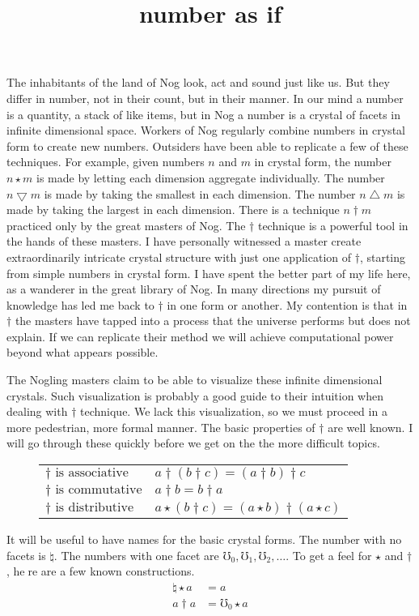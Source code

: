 \documentclass[12pt]{article}
\title{number as if}
\newcommand{\gcd}{\operatorname{gcd}}
\def\gcd{\bigtriangledown}
\def\lcm{\bigtriangleup}
\def\no{\natural}
\begin{document}
\maketitle

The inhabitants of the land of Nog look, act and sound just like us.  But they differ in number,
not in their count, but in their manner. In our mind a number is a quantity, a stack of like items, but in Nog
a number is a crystal of facets in infinite dimensional space. Workers of Nog regularly combine numbers in crystal form
to create new numbers.  Outsiders have been able to replicate a few of these techniques.   For example, given numbers $n$ and $m$ in crystal form, the
number $n\star m$ is made by letting each dimension aggregate individually. The number $n\gcd m$ is made by taking the
smallest in each dimension.  The number $n\lcm m$ is made by taking the
largest in each dimension.  There is a technique $n\dagger m$ practiced only by the great masters of Nog.  The $\dagger$ technique is a powerful
tool in the hands of these masters.  I have personally witnessed a master create extraordinarily intricate crystal structure with just one application of $\dagger$, starting from simple
numbers in crystal form.  I have spent the better part of my life here, as a wanderer in the great library of Nog.  In many directions my pursuit of knowledge has led me back to $\dagger$
in one form or another.  My contention is that in $\dagger$ the masters have tapped into a process that the universe performs but does not explain. If we can replicate their method
we will achieve computational power beyond what appears possible.

The Nogling masters claim to be able to visualize these infinite dimensional crystals.  Such visualization is probably a good guide to their intuition when dealing with $\dagger$ technique.
We lack this visualization, so we must proceed in a more pedestrian, more formal manner.
The basic properties of $\dagger$ are well known.  I will go through these quickly before we get on the the more difficult topics.  

\begin{figure}
\centering
\begin{tabular}{l|l}
$\dagger \text{ is associative}$ & $a\dagger(b\dagger c) = (a\dagger b) \dagger c$\\
$\dagger \text{ is commutative}$ & $a \dagger b = b\dagger a$\\
$\dagger \text{ is distributive}$ & $a\star (b \dagger c) = (a\star b)\dagger(a\star c)$\\
\end{tabular}
\end{figure}

It will be useful to have names for the basic crystal forms.  The number with no facets is $\no$.
The numbers with one facet are $\mho_0,\mho_1,\mho_2, \ldots$.  To get a feel for $\star$ and $\dagger$, here are a few known constructions.
\begin{align*}
\no \star a &= a\\
a \dagger a &= \mho_0 \star a\\
\end{align*}
\end{document}
